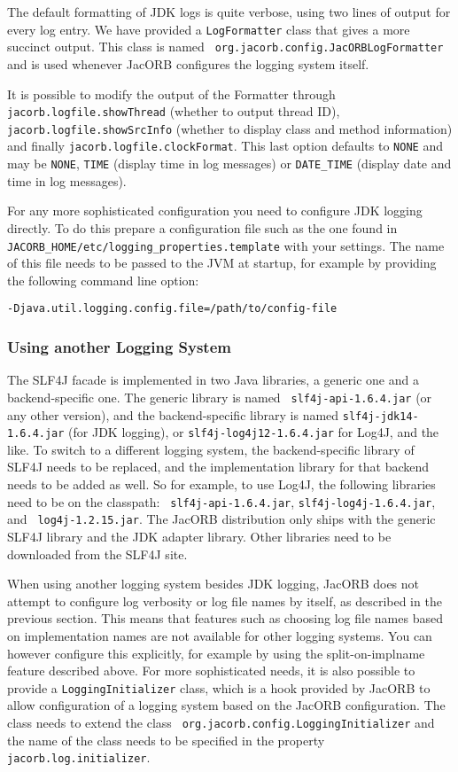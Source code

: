 The default formatting of JDK logs is quite verbose, using two lines
of output for every log entry.  We have provided a {\tt LogFormatter}
class that gives a more succinct output.  This class is named {\tt
  org.jacorb.config.JacORBLogFormatter} and is used whenever JacORB
configures the logging system itself.

It is possible to modify the output of the Formatter through {\tt jacorb.logfile.showThread}
(whether to output thread ID), {\tt jacorb.logfile.showSrcInfo} (whether to
display class and method information) and finally {\tt jacorb.logfile.clockFormat}. This
last option defaults to {\tt NONE} and may be {\tt NONE}, {\tt TIME}
(display time in log messages) or {\tt DATE\_TIME} (display date and time in
log messages).


For any more sophisticated configuration you need to configure JDK logging
directly.  To do this prepare a
configuration file such as the one found in {\tt
  JACORB\_HOME/etc/logging\_properties.template} with your settings.
The name of this file needs to be passed to the JVM at startup, for
example by providing the following command line option:
\begin{verbatim}
-Djava.util.logging.config.file=/path/to/config-file
\end{verbatim}

\subsubsection{Using another Logging System}

The SLF4J facade is implemented in two Java libraries, a generic one
and a backend-specific one.  The generic library is named {\tt
  slf4j-api-1.6.4.jar} (or any other version), and the
backend-specific library is named {\tt slf4j-jdk14-1.6.4.jar} (for JDK
logging), or {\tt slf4j-log4j12-1.6.4.jar} for Log4J, and the like.  To
switch to a different logging system, the backend-specific library of
SLF4J needs to be replaced, and the implementation library for that
backend needs to be added as well.  So for example, to use Log4J, the
following libraries need to be on the classpath: {\tt
  slf4j-api-1.6.4.jar}, {\tt slf4j-log4j-1.6.4.jar}, and {\tt
  log4j-1.2.15.jar}.  The JacORB distribution only ships with the
generic SLF4J library and the JDK adapter library.  Other libraries
need to be downloaded from the SLF4J site.

When using another logging system besides JDK logging, JacORB does not
attempt to configure log verbosity or log file names by itself, as
described in the previous section.  This means that features such as
choosing log file names based on implementation names are not
available for other logging systems.  You can however configure this
explicitly, for example by using the split-on-implname feature
described above.  For more sophisticated needs, it is also possible to
provide a {\tt LoggingInitializer} class, which is a hook provided by
JacORB to allow configuration of a logging system based on the JacORB
configuration.  The class needs to extend the class {\tt
  org.jacorb.config.LoggingInitializer} and the name of the class
needs to be specified in the property {\tt jacorb.log.initializer}.

